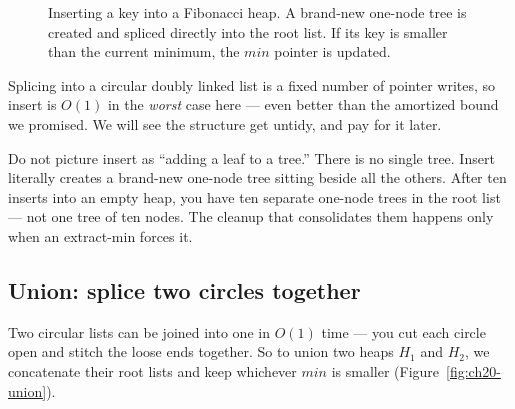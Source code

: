 \begin{figure}[htbp]
\centering
{}
\caption{Inserting a key into a Fibonacci heap. A brand-new one-node tree is created and spliced directly into the root list. If its key is smaller than the current minimum, the $\mathit{min}$ pointer is updated.}
\label{fig:ch20-insert}
\end{figure}

Splicing into a circular doubly linked list is a fixed number of pointer writes,
so insert is $O(1)$ in the \emph{worst} case here --- even better than the
amortized bound we promised. We will see the structure get untidy, and pay for it
later.

\begin{trapbox}
Do not picture insert as ``adding a leaf to a tree.'' There is no single tree.
Insert literally creates a brand-new one-node tree sitting beside all the others.
After ten inserts into an empty heap, you have ten separate one-node trees in the
root list --- not one tree of ten nodes. The cleanup that consolidates them happens
only when an extract-min forces it.
\end{trapbox}

\subsection{Union: splice two circles together}

Two circular lists can be joined into one in $O(1)$ time --- you cut each circle
open and stitch the loose ends together. So to union two heaps $H_1$ and $H_2$, we
concatenate their root lists and keep whichever $\mathit{min}$ is smaller (Figure~\ref{fig:ch20-union}).

